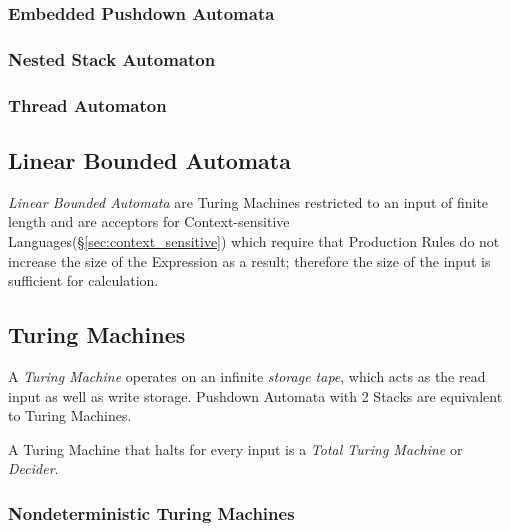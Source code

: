 \subsubsection{Embedded Pushdown Automata}\label{sec:embedded_pushdown}



\subsubsection{Nested Stack Automaton}\label{sec:nested_stack_automaton}



\subsubsection{Thread Automaton}\label{sec:thread_automaton}



\subsection{Linear Bounded Automata} \label{sec:linear_bounded_automata}

\emph{Linear Bounded Automata} are Turing Machines restricted to an
input of finite length and are acceptors for Context-sensitive
Languages(\S\ref{sec:context_sensitive}) which require that
Production Rules do not increase the size of the Expression as a
result; therefore the size of the input is sufficient for calculation.



\subsection{Turing Machines}\label{sec:turing_machine}

A \emph{Turing Machine} operates on an infinite \emph{storage tape},
which acts as the read input as well as write storage. Pushdown
Automata with 2 Stacks are equivalent to Turing Machines.

A Turing Machine that halts for every input is a \emph{Total Turing
  Machine} or \emph{Decider}.



\subsubsection{Nondeterministic Turing Machines}

